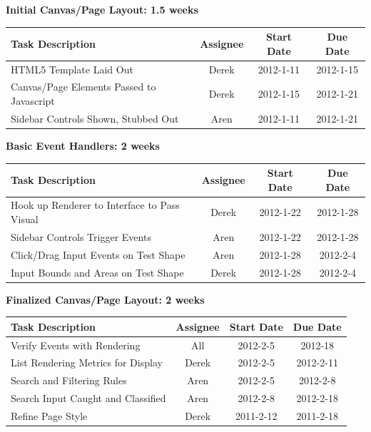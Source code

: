 \documentclass[12pt, letterpaper]{article}
\begin{document}
  \begin{center}
		{\bf Initial Canvas/Page Layout: 1.5 weeks}
    \begin{tabular}{| p{8.3cm} || c | c | c | }
      \hline
      Task Description & Assignee & Start Date & Due Date \\
      \hline
	    HTML5 Template Laid Out & Derek & 2012-1-11 & 2012-1-15 \\
	    Canvas/Page Elements Passed to Javascript & Derek & 2012-1-15 & 2012-1-21 \\
	    Sidebar Controls Shown, Stubbed Out & Aren & 2012-1-11 & 2012-1-21 \\
      \hline
    \end{tabular}
  \end{center}

  \begin{center}
		{\bf Basic Event Handlers: 2 weeks}
    \begin{tabular}{| p{8.3cm} || c | c | c | }
      \hline
      Task Description & Assignee & Start Date & Due Date \\
      \hline
	    Hook up Renderer to Interface to Pass Visual & Derek & 2012-1-22 & 2012-1-28 \\
 	    Sidebar Controls Trigger Events & Aren & 2012-1-22 & 2012-1-28 \\
	    Click/Drag Input Events on Test Shape & Aren & 2012-1-28 & 2012-2-4 \\
	    Input Bounds and Areas on Test Shape & Derek & 2012-1-28 & 2012-2-4 \\
      \hline
    \end{tabular}
  \end{center}

  \begin{center}
		{\bf Finalized Canvas/Page Layout: 2 weeks}
    \begin{tabular}{| p{8.3cm} || c | c | c | }
      \hline
      Task Description & Assignee & Start Date & Due Date \\
      \hline
	    Verify Events with Rendering & All & 2012-2-5 & 2012-18 \\
	    List Rendering Metrics for Display & Derek & 2012-2-5 & 2012-2-11 \\
	    Search and Filtering Rules & Aren & 2012-2-5 & 2012-2-8 \\
	    Search Input Caught and Classified & Aren & 2012-2-8 & 2012-2-18 \\
		Refine Page Style & Derek & 2011-2-12 & 2011-2-18 \\
      \hline
    \end{tabular}
  \end{center}
\end{document}
